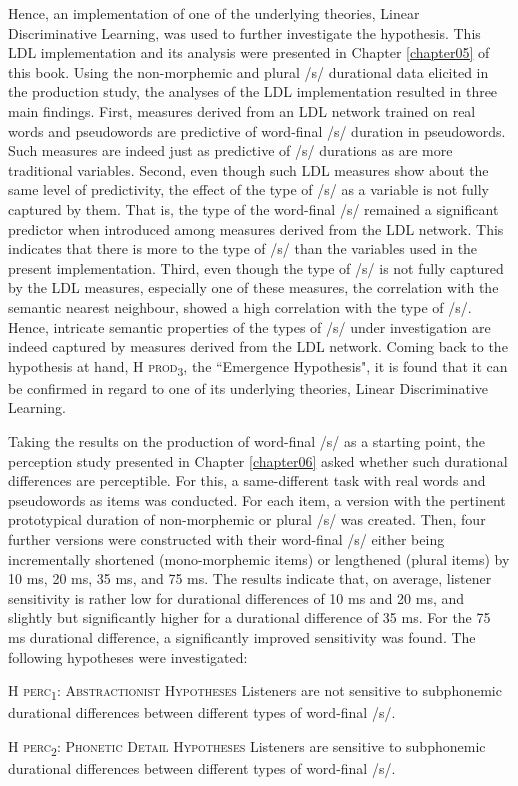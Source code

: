 Hence, an implementation of one of the underlying theories, Linear Discriminative Learning, was used to further investigate the hypothesis. This LDL implementation and its analysis were presented in Chapter \ref{chapter05} of this book. Using the non-morphemic and plural /s/ durational data elicited in the production study, the analyses of the LDL implementation resulted in three main findings. First, measures derived from an LDL network trained on real words and pseudowords are predictive of word-final /s/ duration in pseudowords. Such measures are indeed just as predictive of /s/ durations as are more traditional variables. Second, even though such LDL measures show about the same level of predictivity, the effect of the type of /s/ as a variable is not fully captured by them. That is, the type of the word-final /s/ remained a significant predictor when introduced among measures derived from the LDL network. This indicates that there is more to the type of /s/ than the variables used in the present implementation. Third, even though the type of /s/ is not fully captured by the LDL measures, especially one of these measures, the correlation with the semantic nearest neighbour, showed a high correlation with the type of /s/. Hence, intricate semantic properties of the types of /s/ under investigation are indeed captured by measures derived from the LDL network. Coming back to the hypothesis at hand, \textsc{H prod\textsubscript{3}}, the ``Emergence Hypothesis", it is found that it can be confirmed in regard to one of its underlying theories, Linear Discriminative Learning.

Taking the results on the production of word-final /s/ as a starting point, the perception study presented in Chapter \ref{chapter06} asked whether such durational differences are perceptible. For this, a same-different task with real words and pseudowords as items was conducted. For each item, a version with the pertinent prototypical duration of non-morphemic or plural /s/ was created. Then, four further versions were constructed with their word-final /s/ either being incrementally shortened (mono-morphemic items) or lengthened (plural items) by 10 ms, 20 ms, 35 ms, and 75 ms. The results indicate that, on average, listener sensitivity is rather low for durational differences of 10 ms and 20 ms, and slightly but significantly higher for a durational difference of 35 ms. For the 75 ms durational difference, a significantly improved sensitivity was found. The following hypotheses were investigated:

\begin{description}
\item\textsc{H perc\textsubscript{1}}: \textsc{Abstractionist Hypotheses} \newline
Listeners are not sensitive to subphonemic durational differences between different types of word-final /s/.

\item\textsc{H perc\textsubscript{2}}: \textsc{Phonetic Detail Hypotheses} \newline
Listeners are sensitive to subphonemic durational differences between different types of word-final /s/.
\end{description}

